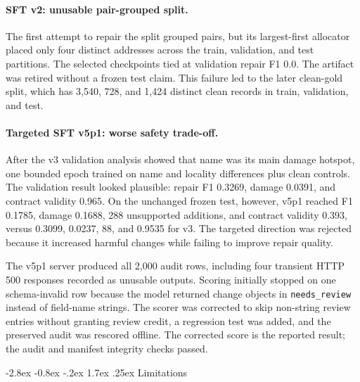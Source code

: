 \documentclass[11pt]{article}
\makeatletter
\renewcommand\section{\@startsection{section}{1}{\z@}%
  {-2.8ex \@plus -0.8ex \@minus -.2ex}%
  {1.7ex \@plus .25ex}%
  {\normalfont\Large\bfseries}}
\makeatother
\begin{document}
\paragraph{SFT v2: unusable pair-grouped split.} The first attempt to
repair the split grouped pairs, but its largest-first allocator placed
only four distinct addresses across the train, validation, and test
partitions. The selected checkpoints tied at validation repair F1 0.0.
The artifact was retired without a frozen test claim. This failure led to
the later clean-gold split, which has 3,540, 728, and 1,424 distinct
clean records in train, validation, and test.

\paragraph{Targeted SFT v5p1: worse safety trade-off.} After the v3
validation analysis showed that name was its main damage hotspot, one
bounded epoch trained on name and locality differences plus clean
controls. The validation result looked plausible: repair F1 0.3269,
damage 0.0391, and contract validity 0.965. On the unchanged frozen test,
however, v5p1 reached F1 0.1785, damage 0.1688, 288 unsupported additions,
and contract validity 0.393, versus 0.3099, 0.0237, 88, and 0.9535 for
v3. The targeted direction was rejected because it increased harmful
changes while failing to improve repair quality.

The v5p1 server produced all 2,000 audit rows, including four transient
HTTP 500 responses recorded as unusable outputs. Scoring initially stopped
on one schema-invalid row because the model returned change objects in
\texttt{needs\_review} instead of field-name strings. The scorer was
corrected to skip non-string review entries without granting review
credit, a regression test was added, and the preserved audit was
rescored offline. The corrected score is the reported result; the audit
and manifest integrity checks passed.

\section{Limitations}
\label{sec:limits}
\end{document}
